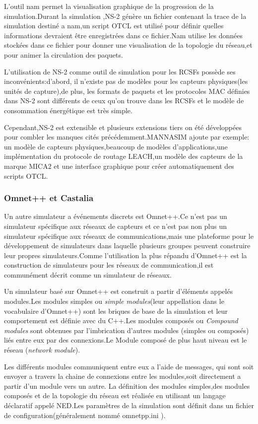 L'outil nam permet la visualisation graphique de la progression de la simulation.Durant la simulation ,NS-2 génère un fichier  contenant la trace de la simulation destiné a nam,un script OTCL est utilisé pour définir quelles informations devraient être enregistrées dans ce fichier.Nam utilise les données stockées dans ce fichier pour donner une visualisation de la topologie du réseau,et pour animer la circulation des paquets.

L'utilisation de NS-2 comme outil de simulation pour les RCSFs possède ses inconvénients:d'abord, il n'existe pas  de modèles pour les capteurs physiques(les unités de capture),de plus, les formats de paquets et les protocoles MAC définies dans NS-2 sont différents de ceux qu'on trouve dans les RCSFs et le modèle de consommation énergétique est très simple.

Cependant,NS-2 est extensible et plusieurs extensions tiers on été développées pour combler les manques cités précédemment.MANNASIM ajoute par exemple: un modèle de capteurs physiques,beaucoup de modèles d'applications,une implémentation du protocole de routage LEACH,un modèle des capteurs de la marque MICA2 et une interface graphique pour créer automatiquement des scripts OTCL.

\subsubsection{Omnet++ et Castalia}
Un autre simulateur a événements discrets est Omnet++.Ce n'est pas un simulateur spécifique aux réseaux de capteurs et ce n'est pas non plus un simulateur spécifique aux réseaux de communications,mais une plateforme pour le développement de simulateurs dans laquelle plusieurs groupes peuvent construire leur propres simulateurs.Comme l'utilisation la plus répandu d'Omnet++ est la construction de simulateurs pour les réseaux de communication,il est communément décrit comme un simulateur de réseaux.

Un simulateur basé sur Omnet++ est construit a partir d'éléments appelés modules.Les modules simples ou \emph{simple modules}(leur appellation dans le vocabulaire d'Omnet++) sont les briques de base de la simulation et leur comportement est définie avec du C++.Les modules composés ou \emph{Compound modules} sont obtenues par l'imbrication d'autres modules (simples ou composés) liés entre eux par des connexions.Le Module composé de plus haut niveau est le réseau (\emph{network module}).

Les différents modules communiquent entre eux a l'aide de messages, qui sont soit envoyer a travers la chaine de connexions entre les modules,soit  directement a partir d'un module vers un autre.
La définition des modules simples,des modules composés et de la topologie du réseau est réalisée en utilisant un langage déclaratif appelé NED.Les paramètres de la simulation sont définit dans un fichier de configuration(généralement nommé omnetpp.ini ).

